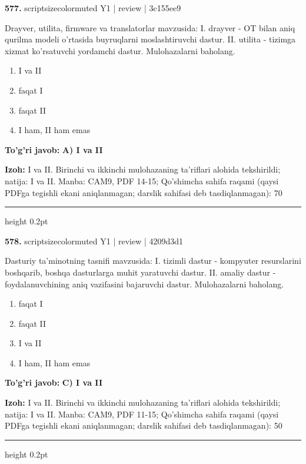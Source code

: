 \documentclass[10pt,a4paper]{article}
\begin{document}
{\bfseries\sffamily\color{ink} 577.} {scriptsizecolor{muted} Y1 | review | 3c155ee9}
\par
Drayver, utilita, firmware va translatorlar mavzusida: I. drayver - OT bilan aniq qurilma modeli o'rtasida buyruqlarni moslashtiruvchi dastur. II. utilita - tizimga xizmat ko'rsatuvchi yordamchi dastur. Mulohazalarni baholang.
\begin{enumerate}[label=\Alph*),leftmargin=9mm]
\item I va II
\item faqat I
\item faqat II
\item I ham, II ham emas
\end{enumerate}
\begin{tcolorbox}[enhanced,breakable,colback=teal!4,colframe=teal!60!black,boxrule=0.45pt,arc=1.2mm,left=2.7mm,right=2.7mm,top=1.8mm,bottom=1.8mm,before skip=2mm,after skip=2mm]
{\bfseries\sffamily\color{teal}To'g'ri javob:} \textbf{A) I va II}
\par\smallskip
{\bfseries Izoh:} I va II. Birinchi va ikkinchi mulohazaning ta'riflari alohida tekshirildi; natija: I va II. Manba: CAM9, PDF 14-15; Qo'shimcha sahifa raqami (qaysi PDFga tegishli ekani aniqlanmagan; darslik sahifasi deb tasdiqlanmagan): 70
\end{tcolorbox}
\vspace{2mm}\hrule height 0.2pt\vspace{3mm}

{\bfseries\sffamily\color{ink} 578.} {scriptsizecolor{muted} Y1 | review | 4209d3d1}
\par
Dasturiy ta'minotning tasnifi mavzusida: I. tizimli dastur - kompyuter resurslarini boshqarib, boshqa dasturlarga muhit yaratuvchi dastur. II. amaliy dastur - foydalanuvchining aniq vazifasini bajaruvchi dastur. Mulohazalarni baholang.
\begin{enumerate}[label=\Alph*),leftmargin=9mm]
\item faqat I
\item faqat II
\item I va II
\item I ham, II ham emas
\end{enumerate}
\begin{tcolorbox}[enhanced,breakable,colback=teal!4,colframe=teal!60!black,boxrule=0.45pt,arc=1.2mm,left=2.7mm,right=2.7mm,top=1.8mm,bottom=1.8mm,before skip=2mm,after skip=2mm]
{\bfseries\sffamily\color{teal}To'g'ri javob:} \textbf{C) I va II}
\par\smallskip
{\bfseries Izoh:} I va II. Birinchi va ikkinchi mulohazaning ta'riflari alohida tekshirildi; natija: I va II. Manba: CAM9, PDF 11-15; Qo'shimcha sahifa raqami (qaysi PDFga tegishli ekani aniqlanmagan; darslik sahifasi deb tasdiqlanmagan): 50
\end{tcolorbox}
\vspace{2mm}\hrule height 0.2pt\vspace{3mm}
\end{document}
